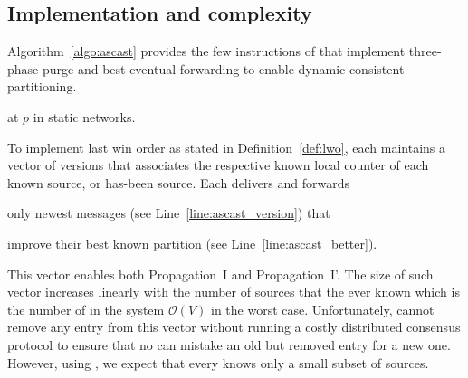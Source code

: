 

\subsection{Implementation and complexity}

Algorithm~\ref{algo:ascast} provides the few instructions of \NAME
that implement three-phase purge and best eventual forwarding to
enable dynamic consistent partitioning.



\begin{algorithm}
  
  \caption{\label{algo:ascast}\NAME at \Process $p$ in static networks.}
\end{algorithm}

To implement last win order as stated in Definition~\ref{def:lwo},
each \process maintains a vector of versions that associates the
respective known local counter of each known source, or has-been
source.  Each \process delivers and forwards
\begin{inparaenum}[(i)]
\item only newest messages (see Line~\ref{line:ascast_version}) that
\item improve their best known partition (see
  Line~\ref{line:ascast_better}).
\end{inparaenum}
This vector enables both Propagation~I and Propagation~I'.  The size
of such vector increases linearly with the number of sources that the
\process ever known which is the number of \processes in the system
$\mathcal{O}(V)$ in the worst case. Unfortunately, \processes cannot
remove any entry from this vector without running a costly distributed
consensus protocol to ensure that no \process can mistake an old but
removed entry for a new one. However, using \NAMEB, we expect that
every \process knows only a small subset of sources.

